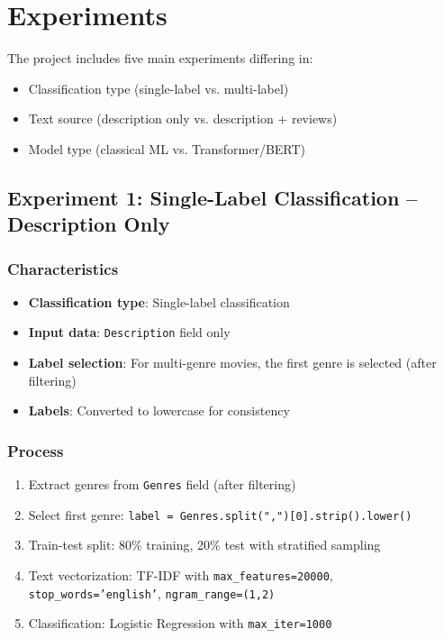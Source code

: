 \documentclass[12pt,a4paper]{article}
\begin{document}
\section{Experiments}

The project includes five main experiments differing in:
\begin{itemize}
    \item Classification type (single-label vs. multi-label)
    \item Text source (description only vs. description + reviews)
    \item Model type (classical ML vs. Transformer/BERT)
\end{itemize}

\subsection{Experiment 1: Single-Label Classification -- Description Only}

\subsubsection{Characteristics}
\begin{itemize}
    \item \textbf{Classification type}: Single-label classification
    \item \textbf{Input data}: \texttt{Description} field only
    \item \textbf{Label selection}: For multi-genre movies, the first genre is selected (after filtering)
    \item \textbf{Labels}: Converted to lowercase for consistency
\end{itemize}

\subsubsection{Process}
\begin{enumerate}
    \item Extract genres from \texttt{Genres} field (after filtering)
    \item Select first genre: \texttt{label = Genres.split(",")[0].strip().lower()}
    \item Train-test split: 80\% training, 20\% test with stratified sampling
    \item Text vectorization: TF-IDF with \texttt{max\_features=20000}, \texttt{stop\_words='english'}, \texttt{ngram\_range=(1,2)}
    \item Classification: Logistic Regression with \texttt{max\_iter=1000}
\end{enumerate}
\end{document}
